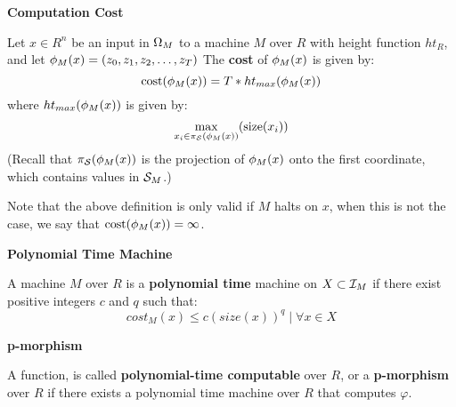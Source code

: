 \begin{definition}{\textbf{Computation Cost}}
  \label{def:size}
  
  Let $x \in R^n$ be an input in $\Omega_M$ to a machine $M$ over
  $R$ with height function $ht_R$, and let $\phi_M(x) = (z_0, z_1,
  z_2, \ldots, z_T)$ The \textbf{cost} of $\phi_M(x)$ is given by:
  $$\text{cost}(\phi_M(x)) = T*ht_{max}(\phi_M(x))$$
  where $ht_{max}(\phi_M(x))$ is given by:
  $$\max_{x_i \in \pi_{\mathcal{S}}(\phi_M(x))}(\text{size}(x_i))$$
  (Recall that $\pi_{\mathcal{S}}(\phi_M(x))$ is the projection of
  $\phi_M(x)$ onto the first coordinate, which contains values in
  $\mathcal{S}_M$.)\\


  Note that the above definition is only valid if $M$ halts on $x$,
  when this is not the case, we say that $\text{cost}(\phi_M(x)) = \infty$.

  
\end{definition}

\begin{definition}{\textbf{Polynomial Time Machine}}

  A machine $M$ over $R$ is a \textbf{polynomial time} machine on $X
  \subset \mathcal{I}_M$ if there exist positive integers $c$ and $q$
  such that:
  $$cost_M(x) \leq c(size(x))^q \mid \forall x \in X$$
\end{definition}

\begin{definition}{\textbf{p-morphism}}
  
  A function,  is called
  \textbf{polynomial-time computable} over $R$, or a
  \textbf{p-morphism} over $R$ if there exists a polynomial time
  machine over $R$ that computes $\varphi$.

\end{definition}


